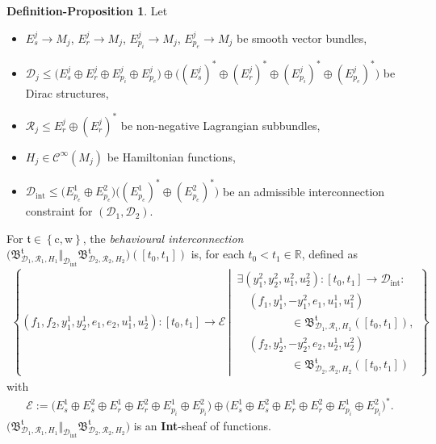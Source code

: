 \documentclass[preprint,12pt]{elsarticle}
\theoremstyle{definition}
\newtheorem{definition-proposition}[theorem]{Definition-Proposition}
\newcommand{\set}[1]{\left\lbrace #1\right\rbrace}
\begin{document}
\begin{definition-proposition}\label{def-prop:behavioural_interconnection}
Let 
\begin{itemize}
\item $E_s^j\to M_j$, $E_r^j\to M_j$, $E_{p_i}^j\to M_j$, $E_{p_e}^j\to M_j$ be smooth vector bundles,
\item $\mathcal{D}_j\leq \big(E_s^j\oplus E_r^j\oplus E_{p_i}^j\oplus E_{p_e}^j\big)\oplus\big((E_s^j)^*\oplus (E_r^j)^*\oplus (E_{p_i}^j)^*\oplus (E_{p_e}^j)^*\big)$ be Dirac structures,
\item $\mathcal{R}_j\leq E_r^j\oplus (E_r^j)^*$ be non-negative Lagrangian subbundles,
\item $H_j\in\mathcal{C}^\infty(M_j)$ be Hamiltonian functions,
\item $\mathcal{D}_{\mathrm{int}}\leq \big(E_{p_e}^1\oplus E_{p_e}^2\big) \big((E_{p_e}^1)^*\oplus (E_{p_e}^2)^*\big)$ be an {admissible interconnection constraint} for $(\mathcal{D}_1,\mathcal{D}_2)$.
\end{itemize}
For $\mathfrak{t}\in\set{\mathrm{c},\mathrm{w}}$, the \textit{behavioural interconnection} $\big(\mathfrak{B}^{\mathfrak{t}}_{\mathcal{D}_1,\mathcal{R}_1,H_1}\Vert_{\mathcal{D}_{\mathrm{int}}}\mathfrak{B}^{\mathfrak{t}}_{\mathcal{D}_2,\mathcal{R}_2,H_2}\big)([t_0,t_1])$ is, for each $t_0<t_1\in\mathbb{R}$, defined as
\begin{align*}
\set{(f_1,f_2,y_1^1,y_2^1,e_1,e_2,u_1^1,u_2^1):[t_0,t_1]\to\mathcal{E}\,\left\vert\,\begin{array}{l}
\exists (y_1^2,y_2^2,u_1^2,u_2^2):[t_0,t_1]\to\mathcal{D}_{\mathrm{int}}:\\
\quad (f_1,y_1^1,-y_1^2,e_1,u_1^1,u_1^2)\\
\hspace{2cm}\in \mathfrak{B}^{\mathfrak{t}}_{\mathcal{D}_1,\mathcal{R}_1,H_1}([t_0,t_1]),\\
\quad (f_2,y_2^1,-y_2^2,e_2,u_2^1,u_2^2)\\
\hspace{2cm}\in \mathfrak{B}^{\mathfrak{t}}_{\mathcal{D}_2,\mathcal{R}_2,H_2}([t_0,t_1])
\end{array}\right.}
\end{align*}
with
\begin{align*}
\mathcal{E} := \big(E_s^1\oplus E_s^2\oplus E_r^1\oplus E_r^2\oplus E_{p_i}^1\oplus E_{p_i}^2\big)\oplus\big(E_s^1\oplus E_s^2\oplus E_r^1\oplus E_r^2\oplus E_{p_i}^1\oplus E_{p_i}^2\big)^*.
\end{align*}
$\big(\mathfrak{B}^{\mathfrak{t}}_{\mathcal{D}_1,\mathcal{R}_1,H_1}\Vert_{\mathcal{D}_{\mathrm{int}}}\mathfrak{B}^{\mathfrak{t}}_{\mathcal{D}_2,\mathcal{R}_2,H_2}\big)$ is an \textbf{Int}-sheaf of functions.
\end{definition-proposition}
\end{document}
